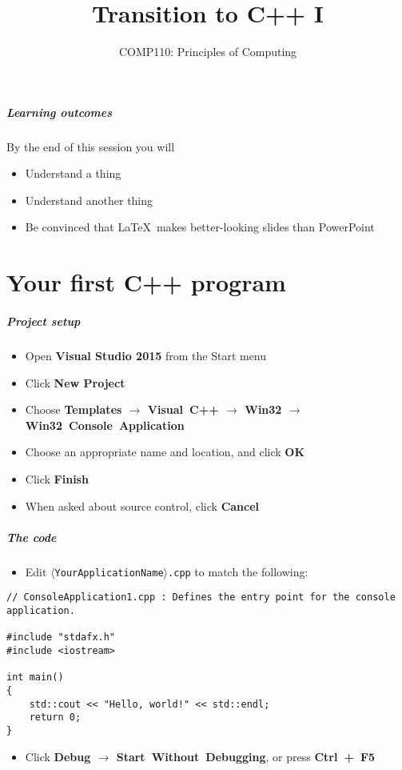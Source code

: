 \documentclass[xcolor={dvipsnames}]{beamer}\usepackage{etoolbox}\newtoggle{printable}\togglefalse{printable}
\begin{document}
\title{Transition to C++ I}   
\subtitle{COMP110: Principles of Computing}

\frame{\titlepage} 

\begin{frame}
	\frametitle{Learning outcomes}
	By the end of this session you will
	\begin{itemize}
		\item Understand a thing
		\item Understand another thing
		\item Be convinced that \LaTeX\ makes better-looking slides than PowerPoint
	\end{itemize}
\end{frame}


\part{Your first C++ program}
\frame{\partpage}

\begin{frame}
	\frametitle{Project setup}
	\begin{itemize}
		\item Open \textbf{Visual Studio 2015} from the Start menu
		\item Click \textbf{New Project}
		\item Choose \textbf{Templates $\to$ Visual~C++ $\to$ Win32 $\to$ Win32~Console~Application}
		\item Choose an appropriate name and location, and click \textbf{OK}
		\item Click \textbf{Finish}
		\item When asked about source control, click \textbf{Cancel}
	\end{itemize}
\end{frame}

\begin{frame}[fragile]
	\frametitle{The code}
	\begin{itemize}
		\item Edit \texttt{$\langle$YourApplicationName$\rangle$.cpp} to match the following:
	\end{itemize}
	\begin{lstlisting}
// ConsoleApplication1.cpp : Defines the entry point for the console application.

#include "stdafx.h"
#include <iostream>

int main()
{
    std::cout << "Hello, world!" << std::endl;
    return 0;
}
	\end{lstlisting}
	\begin{itemize}
		\item Click \textbf{Debug $\to$ Start~Without~Debugging}, or press \textbf{Ctrl~+~F5}
	\end{itemize}
\end{frame}
\end{document}
